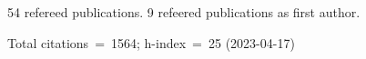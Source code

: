 54 refereed publications. 9 refeered publications as first author.

Total citations~=~1564; h-index~=~25 (2023-04-17)
